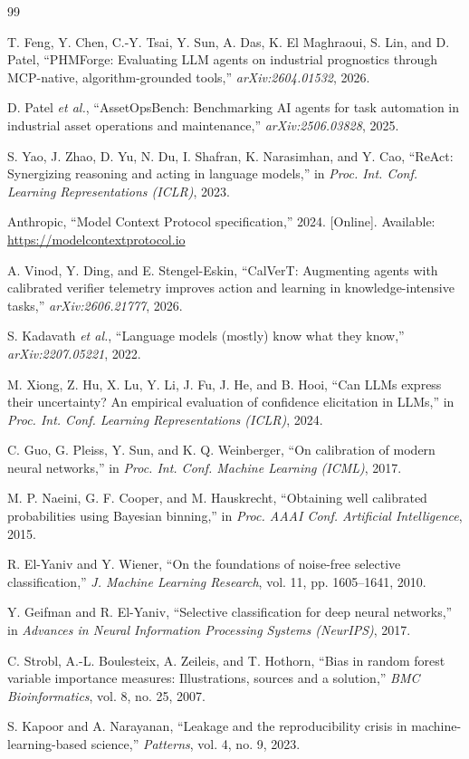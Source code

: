 \documentclass[conference]{IEEEtran}
\begin{document}
\begin{thebibliography}{99}

T. Feng, Y. Chen, C.-Y. Tsai, Y. Sun, A. Das, K. El Maghraoui, S. Lin, and
D. Patel, ``PHMForge: Evaluating LLM agents on industrial prognostics through
MCP-native, algorithm-grounded tools,'' \emph{arXiv:2604.01532}, 2026.

D. Patel \emph{et al.}, ``AssetOpsBench: Benchmarking AI agents for task
automation in industrial asset operations and maintenance,''
\emph{arXiv:2506.03828}, 2025.

S. Yao, J. Zhao, D. Yu, N. Du, I. Shafran, K. Narasimhan, and Y. Cao,
``ReAct: Synergizing reasoning and acting in language models,'' in
\emph{Proc. Int. Conf. Learning Representations (ICLR)}, 2023.

Anthropic, ``Model Context Protocol specification,'' 2024. [Online]. Available:
\url{https://modelcontextprotocol.io}

A. Vinod, Y. Ding, and E. Stengel-Eskin, ``CalVerT: Augmenting agents with
calibrated verifier telemetry improves action and learning in
knowledge-intensive tasks,'' \emph{arXiv:2606.21777}, 2026.

S. Kadavath \emph{et al.}, ``Language models (mostly) know what they know,''
\emph{arXiv:2207.05221}, 2022.

M. Xiong, Z. Hu, X. Lu, Y. Li, J. Fu, J. He, and B. Hooi, ``Can LLMs express
their uncertainty? An empirical evaluation of confidence elicitation in LLMs,''
in \emph{Proc. Int. Conf. Learning Representations (ICLR)}, 2024.

C. Guo, G. Pleiss, Y. Sun, and K. Q. Weinberger, ``On calibration of modern
neural networks,'' in \emph{Proc. Int. Conf. Machine Learning (ICML)}, 2017.

M. P. Naeini, G. F. Cooper, and M. Hauskrecht, ``Obtaining well calibrated
probabilities using Bayesian binning,'' in \emph{Proc. AAAI Conf. Artificial
Intelligence}, 2015.

R. El-Yaniv and Y. Wiener, ``On the foundations of noise-free selective
classification,'' \emph{J. Machine Learning Research}, vol. 11,
pp. 1605--1641, 2010.

Y. Geifman and R. El-Yaniv, ``Selective classification for deep neural
networks,'' in \emph{Advances in Neural Information Processing Systems
(NeurIPS)}, 2017.

C. Strobl, A.-L. Boulesteix, A. Zeileis, and T. Hothorn, ``Bias in random
forest variable importance measures: Illustrations, sources and a solution,''
\emph{BMC Bioinformatics}, vol. 8, no. 25, 2007.

S. Kapoor and A. Narayanan, ``Leakage and the reproducibility crisis in
machine-learning-based science,'' \emph{Patterns}, vol. 4, no. 9, 2023.

\end{thebibliography}
\end{document}
